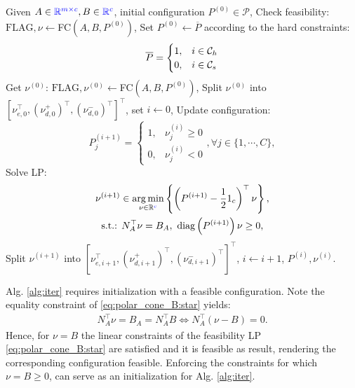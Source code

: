 \documentclass[letterpaper, 10 pt, conference]{ieeeconf}  %
\begin{document}
\begin{algorithm}
\caption{Iterative Constraint Addition: {\selectfont ICA}$(A,B,P^{(0)})$}\label{alg:iter}
\begin{algorithmic}[1]
\State  Given $A\in{\color{blue}\mathbb{R}^{m\times c}},B\in{\color{blue}\mathbb{R}^{c}}$, initial configuration $P^{(0)}\in\mathcal{P}$,
\State Check feasibility: $\mathrm{FLAG},\nu \gets${\selectfont FC}$(A,B,P^{(0)})$,
    \State Set $P^{(0)} \gets \overline{P}$ according to the hard constraints:
    \begin{equation}
    \overline{P} = \begin{cases}
         1, & i \in \mathcal{C}_h\\
         0, & i \in \mathcal{C}_s
    \end{cases}
    \notag 
    \end{equation}
    \State Get $\nu^{(0)}$: $\mathrm{FLAG},\nu^{(0)} \gets${\selectfont FC}$(A,B,P^{(0)})$,
\EndIf
\State  Split $\nu^{(0)}$ into $\left[ \nu_{e,0}^\top, (\nu_{d,0}^{+})^\top, (\nu_{d,0}^{-})^\top\right]^\top$, set $i\gets 0$,
    \State  Update configuration:
    \begin{equation}
        P^{(i+1)}_j = 
        \begin{cases}
            1,& \nu^{(i)}_j \geq 0 \\
            0,& \nu^{(i)}_j < 0
        \end{cases}, \forall j \in \{1,\cdots,C\},
    \end{equation}
    \State  Solve LP:
    \begin{equation}
        \begin{gathered}
        \nu^{(i+1)} \in \underset{\nu\in\mathbb{R}{\color{blue}^c}}{\arg\min}\left\{\left( P^{(i+1)} - \frac{1}{2}{1}_c \right)^\top \nu \right\}, \\
        \textrm{s.t.: } N_{A}^\top \nu = B_{A}, \ \textrm{diag}\left( P^{(i+1)}\right) \nu \geq 0,
        \end{gathered}   
    \end{equation}
    \State  Split $\nu^{(i+1)}$ into $\left[ \nu_{e,i+1}^\top, (\nu_{d,i+1}^{+})^\top, (\nu_{d,i+1}^{-})^\top\right]^\top$,
    \State  $i\gets i+1$,
\EndWhile
\State \Return $P^{(i)},\nu^{(i)}$. 
\end{algorithmic}
\end{algorithm}
\par 
Alg. \ref{alg:iter} requires initialization with a feasible configuration. Note the equality constraint of \eqref{eq:polar_cone_B:star} yields:
\begin{equation}
    \begin{gathered}
        N_A^\top \nu = B_A = N_A^\top B \Leftrightarrow
        N_A^\top \left( \nu - B \right) = 0. 
    \end{gathered}
\end{equation}
Hence, for $\nu = B$ the linear constraints of the feasibility LP \eqref{eq:polar_cone_B:star} are satisfied and it is feasible as result, rendering the corresponding configuration feasible. Enforcing the constraints for which $\nu = B \geq 0$, can serve as an initialization for Alg. \ref{alg:iter}. 
\end{document}
